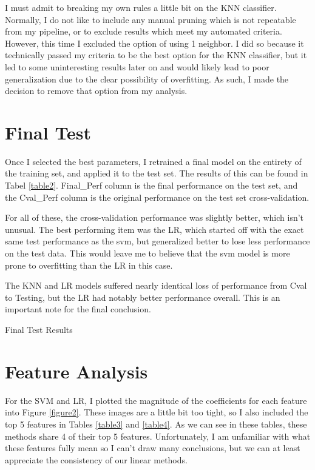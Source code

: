 \documentclass[12pt]{article}
\begin{document}
I must admit to breaking my own rules a little bit on the KNN classifier. Normally, I do not like to include any manual 
pruning which is not repeatable from my pipeline, or to exclude results which meet my automated criteria.
However, this time I excluded the option of using 1 neighbor. I did so because it technically passed my criteria to be the 
best option for the KNN classifier, but it led to some uninteresting results later on and would likely lead to poor generalization
due to the clear possibility of overfitting. As such, I made the decision to remove that option from my analysis. 



\section{Final Test}
Once I selected the best parameters, I retrained a final model on the entirety of the training set, and applied it to the test 
set. The results of this can be found in Tabel \ref{table2}. Final\_Perf column is the final performance on the test set, and the 
Cval\_Perf column is the original performance on the test set cross-validation.

For all of these, the cross-validation performance was slightly better, which isn't unusual. The best performing item was the 
LR, which started off with the exact same test performance as the svm, but generalized better to lose less performance
on the test data. This would leave me to believe that the svm model is more prone to overfitting than the LR in 
this case.

The KNN and LR models suffered nearly identical loss of performance from Cval to Testing, but the LR
had notably better performance overall. This is an important note for the final conclusion.

\begin{table}
  \resizebox*{.95\textwidth}{!}{}
  \caption{Final Test Results}
  \label{table2}
\end{table}

\section{Feature Analysis}
For the SVM and LR, I plotted the magnitude of the coefficients for each feature into Figure \ref{figure2}. These images are 
a little bit too tight, so I also included the top 5 features in Tables \ref{table3} and \ref{table4}. As we can see in these
tables, these methods share 4 of their top 5 features. Unfortunately, I am unfamiliar with what these features fully mean
so I can't draw many conclusions, but we can at least appreciate the consistency of our linear methods.
\end{document}
